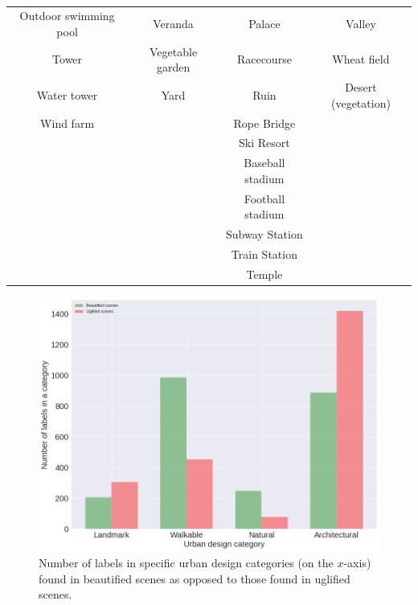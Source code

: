 \begin{table}[htb!]
\begin{tabular}{ |c|c|c|c| }
        Outdoor swimming pool & Veranda & Palace & Valley \\
        Tower & Vegetable garden  & Racecourse & Wheat field \\
        Water tower & Yard & Ruin & Desert (vegetation) \\
        Wind farm &  & Rope Bridge & \\
        &  & Ski Resort & \\
        &  & Baseball stadium & \\
        &  & Football stadium & \\
        &  & Subway Station & \\
        &  & Train Station & \\
        &  & Temple & \\
        \hline
    \end{tabular}
    \caption{}
    \label{tab:PlacesLabels}
\end{table}


\begin{figure}[h]
	\centering
	\includegraphics[width=\columnwidth]{Plot/taxonomyCount.png}
	\caption{Number of labels in specific urban design categories (on the $x$-axis) found in beautified scenes as opposed to those found in uglified scenes.}
	\label{fig:taxonomyCount}
\end{figure}


